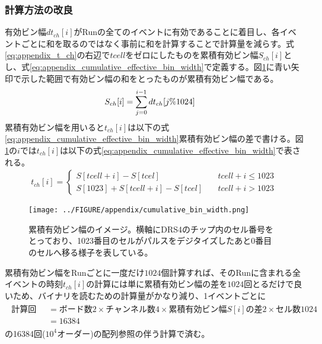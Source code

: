 \documentclass[../../main.tex]{subfiles}
\numberwithin{equation}{section}
\numberwithin{table}{section}
\numberwithin{figure}{section}
\begin{document}
    \subsubsection{計算方法の改良}
      有効ビン幅$dt_{ch}[i]$がRunの全てのイベントに有効であることに着目し、各イベントごとに和を取るのではなく事前に和を計算することで計算量を減らす。式\eqref{eq:appendix_t_ch}の右辺で$tcell$をゼロにしたものを累積有効ビン幅$S_{ch}[i]$とし、式\eqref{eq:appendix_cumulative_effective_bin_width}で定義する。図\ref{fig:appendix_cumulative_bin_width}に青い矢印で示した範囲で有効ビン幅の和をとったものが累積有効ビン幅である。
      \begin{align}
        S_{ch}[i]&=\sum_{j=0}^{i-1}dt_{ch}\qty[j\%1024]\label{eq:appendix_cumulative_effective_bin_width}
      \end{align}
      累積有効ビン幅を用いると$t_{ch}[i]$は以下の式\eqref{eq:appendix_cumulative_effective_bin_width}累積有効ビン幅の差で書ける。図\ref{fig:appendix_cumulative_bin_width}の$i$では$t_{ch}[i]$は以下の式\eqref{eq:appendix_cumulative_effective_bin_width}で表される。
      \begin{align}
        t_{ch}[i]=\begin{cases}
          S[tcell+i]-S[tcel] & \quad tcell+i\leq1023\\
          S[1023]+S[tcell+i]-S[tcel] & \quad tcell+i>1023
        \end{cases}\label{eq:appendix_cumulative_effective_bin_width}
      \end{align}

      \begin{figure}[tbp]
        \centering
        \texttt{[image: ../FIGURE/appendix/cumulative\_bin\_width.png]}
        \caption{累積有効ビン幅のイメージ。横軸にDRS4のチップ内のセル番号をとっており、1023番目のセルがパルスをデジタイズしたあと0番目のセルへ移る様子を表している。}
        \label{fig:appendix_cumulative_bin_width}
      \end{figure}

      累積有効ビン幅をRunごとに一度だけ$1024$個計算すれば、そのRunに含まれる全イベントの時刻$t_{ch}[i]$の計算には単に累積有効ビン幅の差を$1024$回とるだけで良いため、バイナリを読むための計算量がかなり減り、1イベントごとに
      \begin{align}
        \begin{split}
        \text{計算回数}&=\text{ボード数2}\times\text{チャンネル数4}\times\text{累積有効ビン幅$S[i]$の差2}\times\text{セル数1024}\\
        &=16384
      \end{split}
      \end{align}
      の16384回($10^4$オーダー)の配列参照の伴う計算で済む。
\end{document}

